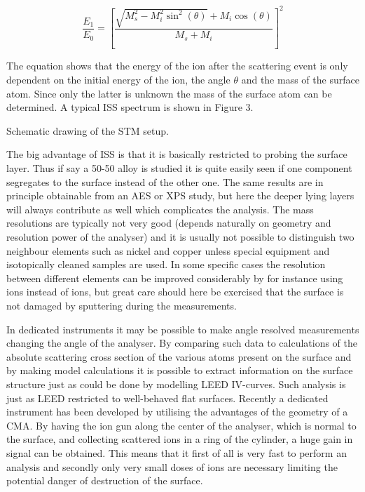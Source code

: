 \begin{equation}
\frac{E_1}{E_0}=\left[\frac{\sqrt{M_s^2-M_i^2\sin^2(\theta)}+M_i\cos(\theta)}{M_s+M_i}\right]^2
\end{equation}

The equation shows that the energy of the ion after the scattering event is only dependent on the initial energy of the ion, the angle $\theta$ and the mass of the surface atom. Since only the latter is unknown the mass of the surface atom can be determined. A typical ISS spectrum is shown in Figure 3. 

\vspace*{11cm}

 Schematic drawing of the STM setup.

\vspace{1cm}

The big advantage of ISS is that it is basically restricted to probing the surface layer. Thus if  say a 50-50 alloy is studied it is quite easily seen if one component segregates to the surface instead of the other one. The same results are in principle obtainable from an AES or XPS study, but here the deeper lying layers will always contribute as well which complicates the analysis. The mass resolutions are typically not very good (depends naturally on geometry and resolution power of the analyser) and it is usually not possible to distinguish two neighbour elements such as nickel and copper unless special equipment and isotopically cleaned samples are used. In some specific cases the resolution between different elements can be improved considerably by for instance using  ions instead of  ions, but great care should here be exercised that the surface is not damaged by sputtering during the measurements.

In dedicated instruments it may be possible to make angle resolved measurements changing the  angle of the analyser. By comparing such data to calculations of the absolute scattering cross section of the various atoms present on the surface and by making model calculations it is possible to extract information on the surface structure just as could be done by modelling LEED IV-curves. Such analysis is just as LEED restricted to well-behaved flat surfaces. Recently a dedicated instrument has been developed by \cite{Brongersma} utilising the advantages of the geometry of a CMA. By having the ion gun along the center of the analyser, which is normal to the surface, and collecting scattered ions in a ring  of the cylinder, a huge gain in signal can be obtained. This means that it first of all is very fast to perform an analysis and secondly only very small doses of ions are necessary limiting the potential danger of destruction of the surface.

